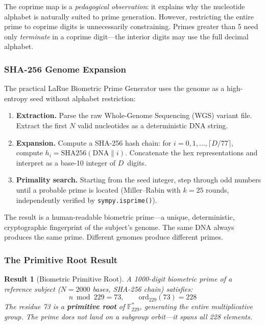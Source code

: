 \documentclass[12pt,a4paper]{article}
\newtheorem{result}[theorem]{Result}
\begin{document}
The coprime map is a \emph{pedagogical observation}: it explains why the nucleotide alphabet is naturally suited to prime generation. However, restricting the entire prime to coprime digits is unnecessarily constraining. Primes greater than 5 need only \emph{terminate} in a coprime digit---the interior digits may use the full decimal alphabet.

\subsubsection{SHA-256 Genome Expansion}

The practical LaRue Biometric Prime Generator uses the genome as a high-entropy seed without alphabet restriction:
\begin{enumerate}[noitemsep]
\item \textbf{Extraction.} Parse the raw Whole-Genome Sequencing (WGS) variant file. Extract the first $N$ valid nucleotides as a deterministic DNA string.
\item \textbf{Expansion.} Compute a SHA-256 hash chain: for $i = 0, 1, \ldots, \lceil D/77 \rceil$, compute $h_i = \mathrm{SHA256}(\mathrm{DNA} \| i)$. Concatenate the hex representations and interpret as a base-10 integer of $D$~digits.
\item \textbf{Primality search.} Starting from the seed integer, step through odd numbers until a probable prime is located (Miller--Rabin with $k = 25$ rounds, independently verified by \texttt{sympy.isprime()}).
\end{enumerate}

The result is a human-readable biometric prime---a unique, deterministic, cryptographic fingerprint of the subject's genome. The same DNA always produces the same prime. Different genomes produce different primes.

\subsubsection{The Primitive Root Result}

\begin{result}[Biometric Primitive Root]
\label{res:primitive-root}
A 1000-digit biometric prime of a reference subject ($N = 2000$ bases, SHA-256 chain) satisfies:
\begin{equation}
n \bmod 229 = 73, \qquad \mathrm{ord}_{229}(73) = 228
\end{equation}
The residue 73 is a \textbf{primitive root} of $\mathbb{F}_{229}^*$, generating the entire multiplicative group. The prime does not land on a subgroup orbit---it spans all 228 elements.
\end{result}
\end{document}
